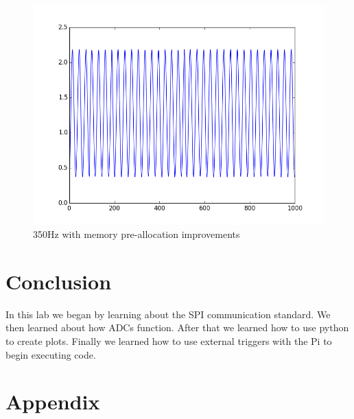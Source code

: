 \documentclass[prl,12pt,notitlepage,aps,onecolumn,superscriptaddress]{revtex4-1}
\begin{document}
\begin{figure}[h]
\begin{center}
\includegraphics[width=.5\columnwidth]{350_array_good.png}
\end{center}
\caption{\label{fig:pic} 350Hz with memory pre-allocation improvements}
\end{figure}

\section{Conclusion}
In this lab we began by learning about the SPI communication standard. We then learned about how ADCs function. After that we learned how to use python to create plots. Finally we learned how to use external triggers with the Pi to begin executing code.

\section{Appendix}


\end{document}
